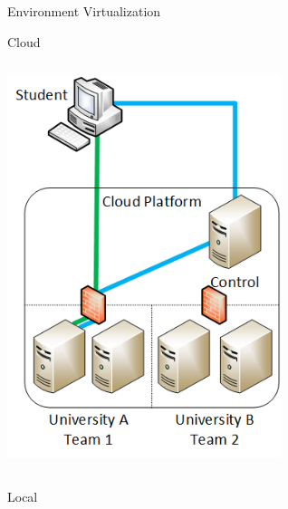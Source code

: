 \documentclass{beamer}
\begin{document}
\begin{frame}{Environment Virtualization}
\begin{block}{Cloud}
{\begin{columns}
            		\begin{column}{0.5\textwidth}
						\begin{center}
                 		\includegraphics[width=0.6\textwidth]{cloud-virt.png}
				\end{center}
              		\end{column}
            		\end{columns}		
			}
		\end{block}
		\begin{block}{Local}
\end{block}
\end{frame}
\end{document}

